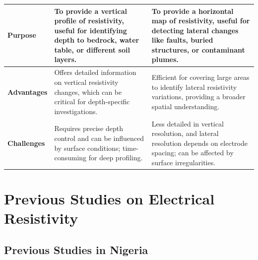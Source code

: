 \documentclass[12pt,a4paper]{report}
\begin{document}
\begin{tabular}{|>{\raggedright\arraybackslash}m{4cm}|>{\raggedright\arraybackslash}m{6cm}|>{\raggedright\arraybackslash}m{6cm}|}
    \textbf{Purpose} & To provide a vertical profile of resistivity, useful for identifying depth to bedrock, water table, or different soil layers. & To provide a horizontal map of resistivity, useful for detecting lateral changes like faults, buried structures, or contaminant plumes. \\ \hline
    
    \textbf{Advantages} & Offers detailed information on vertical resistivity changes, which can be critical for depth-specific investigations. & Efficient for covering large areas to identify lateral resistivity variations, providing a broader spatial understanding. \\ \hline
    
    \textbf{Challenges} & Requires precise depth control and can be influenced by surface conditions; time-consuming for deep profiling. & Less detailed in vertical resolution, and lateral resolution depends on electrode spacing; can be affected by surface irregularities. \\ \hline
\end{tabular}

\section{Previous Studies on Electrical Resistivity}

\subsection{Previous Studies in Nigeria}
\end{document}
